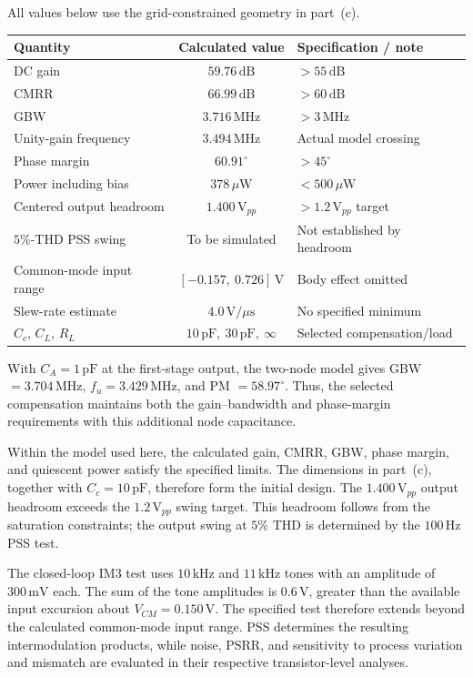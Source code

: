 \documentclass[12pt,letterpaper]{article}
\newcommand{\uW}{\,\mu\mathrm{W}}
\newcommand{\V}{\,\mathrm{V}}
\newcommand{\MHz}{\,\mathrm{MHz}}
\newcommand{\pF}{\,\mathrm{pF}}
\newcommand{\Vus}{\,\mathrm{V}/\mu\mathrm{s}}
\begin{document}
\begin{enumerate}
All values below use the grid-constrained geometry in part~(c).
\begin{center}
\small
\setlength{\tabcolsep}{5pt}
\begin{tabular}{@{}lcl@{}}
\toprule
Quantity & Calculated value & Specification / note\\
\midrule
DC gain & $59.76\,\mathrm{dB}$ & $>55\,\mathrm{dB}$\\
CMRR & $66.99\,\mathrm{dB}$ & $>60\,\mathrm{dB}$\\
GBW & $3.716\MHz$ & $>3\MHz$\\
Unity-gain frequency & $3.494\MHz$ & Actual model crossing\\
Phase margin & $60.91^\circ$ & $>45^\circ$\\
Power including bias & $378\uW$ & $<500\uW$\\
Centered output headroom & $1.400\V_{pp}$ & $>1.2\V_{pp}$ target\\
$5\%$-THD PSS swing & To be simulated & Not established by headroom\\
Common-mode input range & $[-0.157,\ 0.726]\V$ & Body effect omitted\\
Slew-rate estimate & $4.0\Vus$ & No specified minimum\\
$C_c$, $C_L$, $R_L$ & $10\pF,\ 30\pF,\ \infty$ & Selected compensation/load\\
\bottomrule
\end{tabular}
\end{center}
With $C_A=1\pF$ at the first-stage output, the two-node model
gives GBW $=3.704\MHz$, $f_u=3.429\MHz$, and
PM $=58.97^\circ$. Thus, the selected compensation maintains
both the gain--bandwidth and phase-margin requirements with this
additional node capacitance.

Within the model used here, the calculated gain, CMRR, GBW,
phase margin, and quiescent power satisfy the specified limits.
The dimensions in part~(c), together
with $C_c=10\pF$, therefore form the initial design.
The $1.400\V_{pp}$ output headroom exceeds the $1.2\V_{pp}$
swing target. This headroom follows from the saturation constraints;
the output swing at $5\%$ THD is determined by the
$100\,\mathrm{Hz}$ PSS test.

The closed-loop IM3 test uses $10\,\mathrm{kHz}$ and
$11\,\mathrm{kHz}$ tones with an amplitude of $300\,\mathrm{mV}$
each. The sum of the tone amplitudes is $0.6\V$, greater than
the available input excursion about $V_{CM}=0.150\V$.
The specified test therefore extends beyond the calculated
common-mode input range. PSS determines the resulting
intermodulation products, while noise, PSRR, and sensitivity to
process variation and mismatch are evaluated in their respective
transistor-level analyses.


\end{enumerate}
\end{document}
